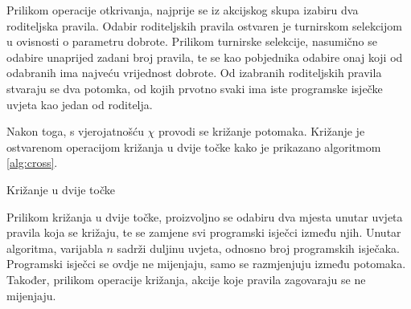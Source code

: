 \documentclass[times, utf8, zavrsni]{fer}
\begin{document}
Prilikom operacije otkrivanja, najprije se iz akcijskog skupa izabiru dva roditeljska pravila.
Odabir roditeljskih pravila ostvaren je turnirskom selekcijom  u ovisnosti o parametru dobrote.
Prilikom turnirske selekcije, nasumično se odabire unaprijed zadani broj pravila, te se kao pobjednika odabire onaj koji od odabranih ima najveću vrijednost dobrote.
Od izabranih roditeljskih pravila stvaraju se dva potomka, od kojih prvotno svaki ima iste programske isječke uvjeta kao jedan od roditelja.

Nakon toga, s vjerojatnošću $\chi$ provodi se križanje potomaka.
Križanje je ostvarenom operacijom križanja u dvije točke  kako je prikazano algoritmom \ref{alg:cross}.
\begin{algorithm}[h]
    \caption{Križanje u dvije točke}
    \label{alg:cross}
    \begin{algorithmic}
        \STATE{$x :=$ proizvoljan decimalni broj iz intervala [0, n)}
        \STATE{$y :=$ proizvoljan decimalni broj iz intervala [0, n)}
        \ENDIF
        \ENDFOR
    \end{algorithmic}
\end{algorithm}
Prilikom križanja u dvije točke, proizvoljno se odabiru dva mjesta unutar uvjeta pravila koja se križaju, te se zamjene svi programski isječci između njih.
Unutar algoritma, varijabla $n$ sadrži duljinu uvjeta, odnosno broj programskih isječaka.
Programski isječci se ovdje ne mijenjaju, samo se razmjenjuju između potomaka.
Također, prilikom operacije križanja, akcije koje pravila zagovaraju se ne mijenjaju.
\end{document}
